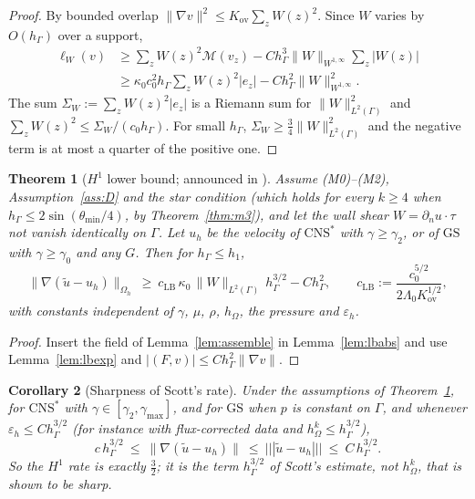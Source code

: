 \documentclass[pdflatex,sn-mathphys-num]{sn-jnl}
\theoremstyle{thmstyleone}
\newtheorem{theorem}{Theorem}[section]
\newtheorem{corollary}[theorem]{Corollary}
\theoremstyle{thmstylethree}
\newcommand{\hG}{h_\Gamma}
\newcommand{\hO}{h_\Omega}
\newcommand{\Oh}{\Omega_h}
\newcommand{\dn}{\partial_n}
\newcommand{\ut}{\tilde u}
\newcommand{\tnorm}[1]{|\!|\!|#1|\!|\!|}
\newcommand{\norm}[1]{\lVert #1\rVert}
\newcommand{\GS}{\mathrm{GS}}
\newcommand{\CNS}{\mathrm{CNS}^\ast}
\newcommand{\eps}{\varepsilon_h}
\begin{document}
\begin{proof}
By bounded overlap $\norm{\nabla v}^2\le K_{\mathrm{ov}}\sum_zW(z)^2$. Since $W$ varies by $O(\hG)$ over a support,
\begin{align*}
\ell_W(v)&\ge\sum_zW(z)^2\mathcal M(v_z)-C\hG^3\norm{W}_{W^{1,\infty}}\sum_z|W(z)|\\
&\ge\kappa_0c_0^2\hG\sum_zW(z)^2|e_z|-C\hG^2\norm{W}^2_{W^{1,\infty}} .
\end{align*}
The sum $\Sigma_W:=\sum_zW(z)^2|e_z|$ is a Riemann sum for $\norm{W}^2_{L^2(\Gamma)}$ and $\sum_zW(z)^2\le\Sigma_W/(c_0\hG)$. For small $\hG$, $\Sigma_W\ge\frac34\norm{W}^2_{L^2(\Gamma)}$ and the negative term is at most a quarter of the positive one.
\end{proof}

\begin{theorem}[$H^1$ lower bound; announced in {\cite{CavalcantePadhiLetter}}]\label{thm:lb}
Assume (M0)--(M2), Assumption~\ref{ass:D} and the star condition (which holds for every $k\ge4$ when $\hG\le2\sin(\theta_{\min}/4)$, by Theorem~\ref{thm:m3}), and let the wall shear $W=\dn u\cdot\tau$ not vanish identically on $\Gamma$. Let $u_h$ be the velocity of $\CNS$ with $\gamma\ge\gamma_2$, or of $\GS$ with $\gamma\ge\gamma_0$ and any $G$. Then for $\hG\le h_1$,
\[
\norm{\nabla(\ut-u_h)}_{\Oh}\ \ge\ c_{\mathrm{LB}}\,\kappa_0\,\norm{W}_{L^2(\Gamma)}\,\hG^{3/2}-C\hG^{2},\qquad c_{\mathrm{LB}}:=\frac{c_0^{5/2}}{2\Lambda_0K_{\mathrm{ov}}^{1/2}},
\]
with constants independent of $\gamma$, $\mu$, $\rho$, $\hO$, the pressure and $\eps$.
\end{theorem}

\begin{proof}
Insert the field of Lemma~\ref{lem:assemble} in Lemma~\ref{lem:lbabs} and use Lemma~\ref{lem:lbexp} and $|(F,v)|\le C\hG^2\norm{\nabla v}$.
\end{proof}

\begin{corollary}[Sharpness of Scott's rate]\label{cor:sharp}
Under the assumptions of Theorem~\ref{thm:lb}, for $\CNS$ with $\gamma\in[\gamma_2,\gamma_{\max}]$, and for $\GS$ when $p$ is constant on $\Gamma$, and whenever $\eps\le C\hG^{3/2}$ (for instance with flux-corrected data and $\hO^k\le\hG^{3/2}$),
\[
c\,\hG^{3/2}\ \le\ \norm{\nabla(\ut-u_h)}\ \le\ \tnorm{\ut-u_h}\ \le\ C\,\hG^{3/2}.
\]
So the $H^1$ rate is exactly $\frac32$; it is the term $\hG^{3/2}$ of Scott's estimate, not $\hO^k$, that is shown to be sharp.
\end{corollary}
\end{document}
